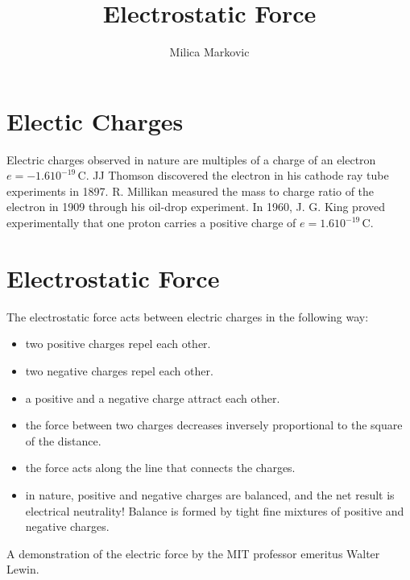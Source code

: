 \documentclass{ximera}
\title{Electrostatic Force}
\author{Milica Markovic}
\begin{document}
  
\begin{abstract}  

\end{abstract}  
\maketitle    



\section{Electic Charges}
 Electric charges observed in nature are multiples of a charge of an electron $e=-1.6 10^{-19}$\,C. JJ Thomson discovered the electron in his cathode ray tube experiments in  1897. R. Millikan measured the mass to charge ratio of the electron in 1909 through his oil-drop experiment.  In 1960, J. G. King proved experimentally that one proton carries a positive charge of $e=1.6 10^{-19}$\,C. 



\section{Electrostatic Force}

The electrostatic force acts between electric charges in the following way:

\begin{itemize}
\item two positive charges repel each other.
\item two negative charges repel each other.
\item a positive and a negative charge attract each other.
\item the force between two charges decreases inversely proportional to the square of the distance.
\item the force acts along the line that connects the charges.
\item in nature, positive and negative charges are balanced, and the net result is electrical neutrality! Balance is formed by tight fine mixtures of positive and negative charges.
\end{itemize}
 
 A demonstration of the electric force  by 
 the MIT professor emeritus Walter Lewin.

 \begin{center}
 \end{center}
 
\end{document}
